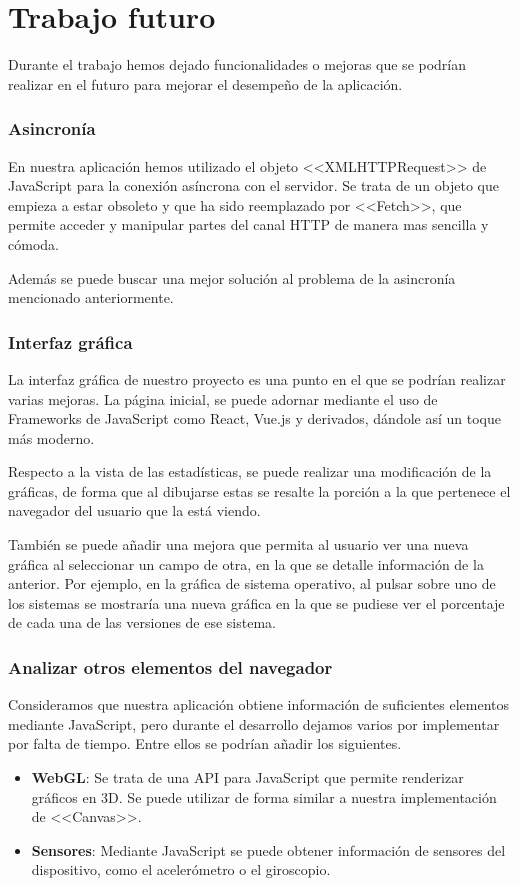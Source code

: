 \section{Trabajo futuro}
Durante el trabajo hemos dejado funcionalidades o mejoras que se podrían realizar en el futuro para mejorar el desempeño de la aplicación.
\subsubsection{Asincronía}
En nuestra aplicación hemos utilizado el objeto <<XMLHTTPRequest>> de JavaScript para la conexión asíncrona con el servidor. Se trata de un objeto que empieza a estar obsoleto y que ha sido reemplazado por <<Fetch>>, que permite acceder y manipular partes del canal HTTP de manera mas sencilla y cómoda.\par 
Además se puede buscar una mejor solución al problema de la asincronía mencionado anteriormente.
\subsubsection{Interfaz gráfica}
La interfaz gráfica de nuestro proyecto es una punto en el que se podrían realizar varias mejoras. La página inicial, se puede adornar mediante el uso de Frameworks de JavaScript como React, Vue.js y derivados, dándole así un toque más moderno. \par 
Respecto a la vista de las estadísticas, se puede realizar una modificación de la gráficas, de forma que al dibujarse estas se resalte la porción a la que pertenece el navegador del usuario que la está viendo.\par 
También se puede añadir una mejora que permita al usuario ver una nueva gráfica al seleccionar un campo de otra, en la que se detalle información de la anterior. Por ejemplo, en la gráfica de sistema operativo, al pulsar sobre uno de los sistemas se mostraría una nueva gráfica en la que se pudiese ver el porcentaje de cada una de las versiones de ese sistema.
\subsubsection{Analizar otros elementos del navegador}
Consideramos que nuestra aplicación obtiene información de suficientes elementos mediante JavaScript, pero durante el desarrollo dejamos varios por implementar por falta de tiempo. Entre ellos se podrían añadir los siguientes.
\begin{itemize}
    \item \textbf{WebGL}: Se trata de una API para JavaScript que permite renderizar gráficos en 3D. Se puede utilizar de forma similar a nuestra implementación de <<Canvas>>.
    \item \textbf{Sensores}: Mediante JavaScript se puede obtener información de sensores del dispositivo, como el acelerómetro o el giroscopio.
\end{itemize}
